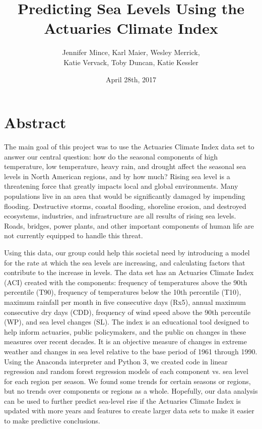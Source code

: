 \documentclass[12pt]{report}
\title{Predicting Sea Levels Using the Actuaries Climate Index}
\date{April 28th, 2017}
\author{Jennifer Mince, Karl Maier, Wesley Merrick,\\ Katie Vervack, Toby Duncan, Katie Kessler}
\begin{document}
	\maketitle
\section*{Abstract} 
\indent	\par The main goal of this project was to use the Actuaries Climate Index data set to answer our central question: how do the seasonal components of high temperature, low temperature, heavy rain, and drought affect the seasonal sea levels in North American regions, and by how much? Rising sea level is a threatening force that greatly impacts local and global environments. Many populations live in an area that would be significantly damaged by impending flooding. Destructive storms, coastal flooding, shoreline erosion, and destroyed ecosystems, industries, and infrastructure are all results of rising sea levels. Roads, bridges, power plants, and other important components of human life are not currently equipped to handle this threat. 
		\par Using this data, our group could help this societal need by introducing a model for the rate at which the sea levels are increasing, and calculating factors that contribute to the increase in levels. The data set has an Actuaries Climate Index (ACI) created with the components: frequency of temperatures above the 90th percentile (T90), frequency of temperatures below the 10th percentile (T10), maximum rainfall per month in five consecutive days (Rx5), annual maximum consecutive dry days (CDD), frequency of wind speed above the 90th percentile (WP), and sea level changes (SL). The index is an educational tool designed to help inform actuaries, public policymakers, and the public on changes in these measures over recent decades.  It is an objective measure of changes in extreme weather and changes in sea level relative to the base period of 1961 through 1990. Using the Anaconda interpreter and Python 3, we created code in linear regression and random forest regression models of each component vs. sea level for each region per season. We found some trends for certain seasons or regions, but no trends over components or regions as a whole. Hopefully, our data analysis can be used to further predict sea-level rise if the Actuaries Climate Index is updated with more years and features to create larger data sets to make it easier to make predictive conclusions. 
\end{document}
